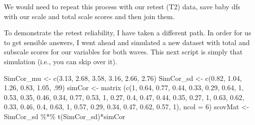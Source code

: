 \documentclass[
  english,
]{book}
\newenvironment{Shaded}{\begin{snugshade}}{\end{snugshade}}
\newcommand{\AttributeTok}[1]{\textcolor[rgb]{0.77,0.63,0.00}{#1}}
\newcommand{\DecValTok}[1]{\textcolor[rgb]{0.00,0.00,0.81}{#1}}
\newcommand{\FloatTok}[1]{\textcolor[rgb]{0.00,0.00,0.81}{#1}}
\newcommand{\FunctionTok}[1]{\textcolor[rgb]{0.00,0.00,0.00}{#1}}
\newcommand{\NormalTok}[1]{#1}
\newcommand{\OtherTok}[1]{\textcolor[rgb]{0.56,0.35,0.01}{#1}}
\newcommand{\SpecialCharTok}[1]{\textcolor[rgb]{0.00,0.00,0.00}{#1}}
\begin{document}
We would need to repeat this process with our retest (T2) data, save baby dfs with our scale and total scale scores and then join them.

To demonstrate the retest reliability, I have taken a different path. In order for us to get sensible answers, I went ahead and simulated a new dataset with total and subscale scores for our variables for both waves. This next script is simply that simulation (i.e., you can skip over it).

\begin{Shaded}
\begin{Highlighting}[]
\NormalTok{SimCor\_mu }\OtherTok{\textless{}{-}} \FunctionTok{c}\NormalTok{(}\FloatTok{3.13}\NormalTok{, }\FloatTok{2.68}\NormalTok{, }\FloatTok{3.58}\NormalTok{, }\FloatTok{3.16}\NormalTok{, }\FloatTok{2.66}\NormalTok{, }\FloatTok{2.76}\NormalTok{)}
\NormalTok{SimCor\_sd }\OtherTok{\textless{}{-}} \FunctionTok{c}\NormalTok{(}\FloatTok{0.82}\NormalTok{, }\FloatTok{1.04}\NormalTok{, }\FloatTok{1.26}\NormalTok{, }\FloatTok{0.83}\NormalTok{, }\FloatTok{1.05}\NormalTok{, .}\DecValTok{99}\NormalTok{)}
\NormalTok{simCor }\OtherTok{\textless{}{-}} \FunctionTok{matrix}\NormalTok{ (}\FunctionTok{c}\NormalTok{(}\DecValTok{1}\NormalTok{,  }\FloatTok{0.64}\NormalTok{,   }\FloatTok{0.77}\NormalTok{,   }\FloatTok{0.44}\NormalTok{,   }\FloatTok{0.33}\NormalTok{,   }\FloatTok{0.29}\NormalTok{,}
                    \FloatTok{0.64}\NormalTok{,   }\DecValTok{1}\NormalTok{,  }\FloatTok{0.53}\NormalTok{,   }\FloatTok{0.35}\NormalTok{,   }\FloatTok{0.46}\NormalTok{,   }\FloatTok{0.34}\NormalTok{,}
                    \FloatTok{0.77}\NormalTok{,   }\FloatTok{0.53}\NormalTok{,   }\DecValTok{1}\NormalTok{,  }\FloatTok{0.27}\NormalTok{,   }\FloatTok{0.4}\NormalTok{,    }\FloatTok{0.47}\NormalTok{,}
                    \FloatTok{0.44}\NormalTok{,   }\FloatTok{0.35}\NormalTok{,   }\FloatTok{0.27}\NormalTok{,   }\DecValTok{1}\NormalTok{,  }\FloatTok{0.63}\NormalTok{,   }\FloatTok{0.62}\NormalTok{,}
                    \FloatTok{0.33}\NormalTok{,   }\FloatTok{0.46}\NormalTok{,   }\FloatTok{0.4}\NormalTok{,    }\FloatTok{0.63}\NormalTok{,   }\DecValTok{1}\NormalTok{,  }\FloatTok{0.57}\NormalTok{,}
                    \FloatTok{0.29}\NormalTok{,   }\FloatTok{0.34}\NormalTok{,   }\FloatTok{0.47}\NormalTok{,   }\FloatTok{0.62}\NormalTok{,   }\FloatTok{0.57}\NormalTok{,   }\DecValTok{1}\NormalTok{),}
                  \AttributeTok{ncol =} \DecValTok{6}\NormalTok{)}
\NormalTok{scovMat }\OtherTok{\textless{}{-}}\NormalTok{ SimCor\_sd }\SpecialCharTok{\%*\%} \FunctionTok{t}\NormalTok{(SimCor\_sd)}\SpecialCharTok{*}\NormalTok{simCor}

\end{Highlighting}
\end{Shaded}
\end{document}
